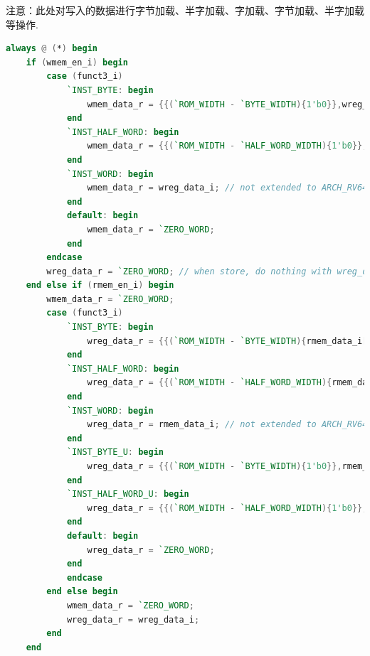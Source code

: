 \documentclass[lang=cn,11pt,a4paper,chinesefont=founder]{elegantpaper}
\begin{document}
注意：此处对写入的数据进行字节加载、半字加载、字加载、字节加载、半字加载等操作. 
\begin{lstlisting}[language=verilog]
always @ (*) begin
	if (wmem_en_i) begin
		case (funct3_i)
			`INST_BYTE: begin
				wmem_data_r = {{(`ROM_WIDTH - `BYTE_WIDTH){1'b0}},wreg_data_i[`BYTE_WIDTH - 1:0]};
			end
			`INST_HALF_WORD: begin
				wmem_data_r = {{(`ROM_WIDTH - `HALF_WORD_WIDTH){1'b0}},wreg_data_i[`HALF_WORD_WIDTH - 1:0]};
			end
			`INST_WORD: begin
				wmem_data_r = wreg_data_i; // not extended to ARCH_RV64, so the code has been simplified
			end
			default: begin
				wmem_data_r = `ZERO_WORD;
			end
		endcase
		wreg_data_r = `ZERO_WORD; // when store, do nothing with wreg_data
	end else if (rmem_en_i) begin
		wmem_data_r = `ZERO_WORD;
		case (funct3_i)
			`INST_BYTE: begin
				wreg_data_r = {{(`ROM_WIDTH - `BYTE_WIDTH){rmem_data_i[`BYTE_WIDTH - 1]}},rmem_data_i[`BYTE_WIDTH - 1:0]};
			end
			`INST_HALF_WORD: begin
				wreg_data_r = {{(`ROM_WIDTH - `HALF_WORD_WIDTH){rmem_data_i[`HALF_WORD_WIDTH - 1]}},rmem_data_i[`HALF_WORD_WIDTH - 1]};
			end
			`INST_WORD: begin
				wreg_data_r = rmem_data_i; // not extended to ARCH_RV64, so the code has been simplified
			end
			`INST_BYTE_U: begin
				wreg_data_r = {{(`ROM_WIDTH - `BYTE_WIDTH){1'b0}},rmem_data_i[`BYTE_WIDTH - 1:0]};
			end
			`INST_HALF_WORD_U: begin
				wreg_data_r = {{(`ROM_WIDTH - `HALF_WORD_WIDTH){1'b0}},rmem_data_i[`HALF_WORD_WIDTH - 1]};
			end
			default: begin
				wreg_data_r = `ZERO_WORD;
			end
			endcase
		end else begin
			wmem_data_r = `ZERO_WORD;
			wreg_data_r = wreg_data_i;
		end
	end
\end{lstlisting}
\end{document}
